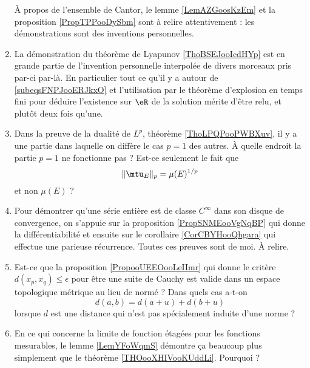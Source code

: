 \begin{enumerate}
        À propos de l'ensemble de Cantor, le lemme \ref{LemAZGoosKzEm} et la proposition \ref{PropTPPooDySbm} sont à relire attentivement : les démonstrations sont des inventions personnelles.

    \item

        La démonstration du théorème de Lyapunov \ref{ThoBSEJooIcdHYp} est en grande partie de l'invention personnelle interpolée de divers morceaux pris par-ci par-là. En particulier tout ce qu'il y a autour de \eqref{subeqsFNPJooERJkxO} et l'utilisation par le théorème d'explosion en temps fini pour déduire l'existence sur \( \eR\) de la solution mérite d'être relu, et plutôt deux fois qu'une.

    \item

        Dans la preuve de la dualité de \( L^p\), théorème \ref{ThoLPQPooPWBXuv}, il y a une partie dans laquelle on diffère le cas \( p= 1\) des autres. À quelle endroit la partie \( p=1\) ne fonctionne pas ? Est-ce seulement le fait que
        \begin{equation}
            \| \mtu_E \|_p=\mu(E)^{1/p} 
        \end{equation}
        et non \( \mu(E)\) ?

    \item
        Pour démontrer qu'une série entière est de classe \(  C^{\infty}\) dans son disque de convergence, on s'appuie sur la proposition \ref{PropSNMEooVgNqBP} qui donne la différentiabilité et ensuite sur le corollaire \ref{CorCBYHooQhgara} qui effectue une parieuse récurrence. Toutes ces preuves sont de moi. À relire.
    \item
        Est-ce que la proposition \ref{PropooUEEOooLeIImr} qui donne le critère \( d(x_p,x_q)\leq \epsilon\) pour être une suite de Cauchy est valide dans un espace topologique métrique au lieu de normé ?  Dans quels cas a-t-on
        \begin{equation}
            d(a,b)=d(a+u)+d(b+u) 
        \end{equation}
        lorsque \( d\) est une distance qui n'est pas spécialement induite d'une norme ?
    \item
        En ce qui concerne la limite de fonction étagées pour les fonctions mesurables, le lemme \ref{LemYFoWqmS} démontre ça beaucoup plus simplement que le théorème \ref{THOooXHIVooKUddLi}. Pourquoi ?
\end{enumerate}

